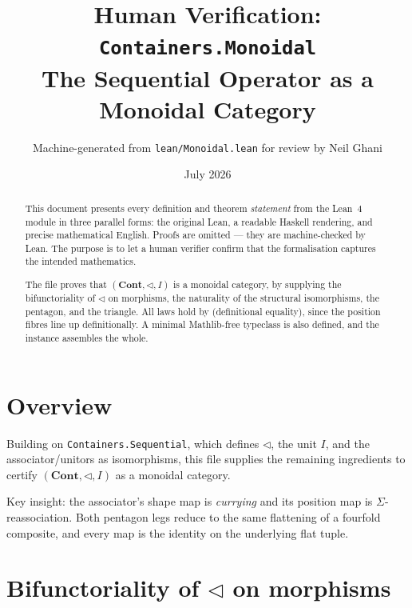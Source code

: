 \documentclass[11pt,a4paper]{article}
\title{Human Verification: \texttt{Containers.Monoidal}\\[4pt]
  \large The Sequential Operator as a Monoidal Category}
\author{Machine-generated from \texttt{lean/Monoidal.lean} for review by Neil Ghani}
\date{July 2026}
\begin{document}
\maketitle

\begin{abstract}
This document presents every definition and theorem \emph{statement} from the
Lean~4 module  in three parallel forms: the original
Lean, a readable Haskell rendering, and precise mathematical English.  Proofs
are omitted --- they are machine-checked by Lean.  The purpose is to let a
human verifier confirm that the formalisation captures the intended
mathematics.

The file proves that $(\mathbf{Cont}, \triangleleft, I)$ is a monoidal
category, by supplying the bifunctoriality of $\triangleleft$ on morphisms,
the naturality of the structural isomorphisms, the pentagon, and the triangle.
All laws hold by  (definitional equality), since the position fibres
line up definitionally.  A minimal Mathlib-free 
typeclass is also defined, and the instance  assembles the
whole.
\end{abstract}

\tableofcontents
\bigskip

\section{Overview}

Building on \texttt{Containers.Sequential}, which defines $\triangleleft$, the
unit $I$, and the associator/unitors as isomorphisms, this file supplies the
remaining ingredients to certify $(\mathbf{Cont}, \triangleleft, I)$ as a
monoidal category.

Key insight: the associator's shape map is \emph{currying} and its position map
is $\Sigma$-reassociation.  Both pentagon legs reduce to the same flattening of
a fourfold composite, and every map is the identity on the underlying flat
tuple.

\section{Bifunctoriality of \texorpdfstring{$\triangleleft$}{seq} on morphisms}
\end{document}

